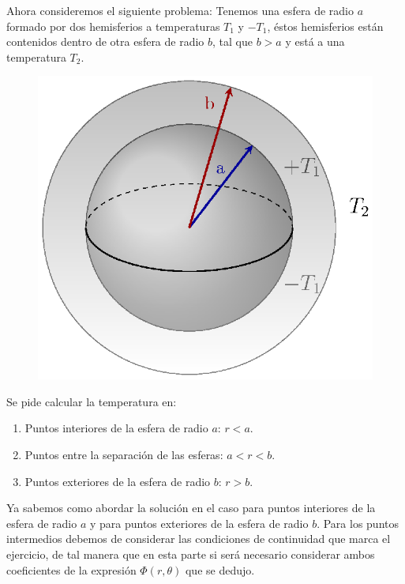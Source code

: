 Ahora consideremos el siguiente problema: Tenemos una esfera de radio $a$ formado por dos hemisferios a temperaturas $T_{1}$ y $-T_{1}$, éstos hemisferios están contenidos dentro de otra esfera de radio $b$, tal que $b > a$ y está a una temperatura $T_{2}$.
\begin{figure}[H]
    \centering
    \includegraphics[scale=1]{Imagenes/Ejemplo_Esfera_02.eps}
\end{figure}

Se pide calcular la temperatura en:
\begin{enumerate}
\item Puntos interiores de la esfera de radio $a$: $r < a$.
\item Puntos entre la separación de las esferas: $a < r < b$.
\item Puntos exteriores de la esfera de radio $b$: $r > b$.
\end{enumerate}

Ya sabemos como abordar la solución en el caso para puntos interiores de la esfera de radio $a$ y para puntos exteriores de la esfera de radio $b$. Para los puntos intermedios debemos de considerar las condiciones de continuidad que marca el ejercicio, de tal manera que en esta parte si será necesario considerar ambos coeficientes de la expresión $\Phi(r,\theta)$ que se dedujo.
